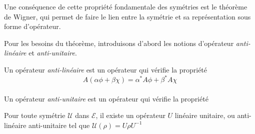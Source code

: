 \documentclass[../notesdecours.tex]{subfiles}
\begin{document}
    Une conséquence de cette propriété fondamentale des symétries est le théorème de Wigner, qui permet de faire le lien entre la symétrie et sa représentation sous forme d'opérateur.

    Pour les besoins du théorème, introduisons d'abord les notions d'opérateur \emph{anti-linéaire} et \emph{anti-unitaire}.

    \begin{definition}
    Un opérateur \emph{anti-linéaire} est un opérateur qui vérifie la propriété
    $$ A(\alpha\phi + \beta\chi) = \alpha^* A\phi + \beta^* A\chi $$ \\
    Un opérateur \emph{anti-unitaire} est un opérateur qui vérifie la propriété
    \end{definition}

    \begin{theorem}[Wigner, 1931]
    Pour toute symétrie $\mathcal{U}$ dans $\mathcal{E}$, il existe un opérateur $U$ linéaire unitaire, ou anti-linéaire anti-unitaire tel que $\mathcal{U}(\rho) = U\rho U^{-1}$
    \end{theorem}
\end{document}
